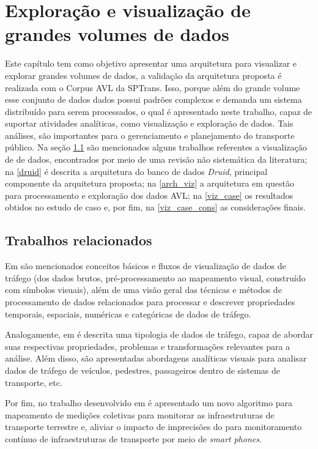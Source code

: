 \documentclass[
	12pt,				%
	oneside,			%
	a4paper,			%
	english,			%
	brazil				%
	]{abntex2ppgsi}
\begin{document}
{{\chapter{Exploração e visualização de grandes volumes de dados}
\label{dataViz}

Este capítulo tem como objetivo apresentar uma arquitetura para visualizar e explorar grandes volumes de dados, a validação da arquitetura proposta é realizada com o Corpus AVL da SPTrans. Isso, porque além do grande volume esse conjunto de dados dados possui padrões complexos e demanda um sistema distribuído para serem processados, o qual é apresentado neste trabalho, capaz de suportar atividades analíticas, como visualização e exploração de dados. Tais análises, são importantes para o gerenciamento e planejamento do transporte público. Na seção \ref{related_work_data_viz} são mencionados alguns trabalhos referentes a visualização de de dados, encontrados por meio de uma revisão não sistemática da literatura; na \ref{druid} é descrita a arquitetura do banco de dados \textit{Druid}, principal componente da arquitetura proposta; na \ref{arch_viz} a arquitetura em questão para processamento e exploração dos dados AVL; na \ref{viz_case} os resultados obtidos no estudo de caso e, por fim, na \ref{viz_case_cons} as considerações finais.

\section{Trabalhos relacionados}
\label{related_work_data_viz}

Em \cite{chen2015survey} são mencionados conceitos básicos e fluxos de visualização de dados de tráfego (dos dados brutos, pré-processamento ao mapeamento visual, construído com símbolos visuais), além de uma visão geral das técnicas e métodos de processamento de dados relacionados para processar e descrever propriedades temporais, espaciais, numéricas e categóricas de dados de tráfego.

Analogamente, em \cite{andrienko2017visual} é descrita uma tipologia de dados de tráfego, capaz de abordar suas respectivas propriedades, problemas e transformações relevantes para a análise. Além disso, são apresentadas abordagens analíticas visuais para analisar dados de tráfego de veículos, pedestres, passageiros dentro de sistemas de transporte, etc.

Por fim, no trabalho desenvolvido em \cite{seraj2017aggregation} é apresentado um novo algoritmo para mapeamento de medições coletivas para monitorar as infraestruturas de transporte terrestre e, aliviar o impacto de imprecisões do  para monitoramento contínuo de infraestruturas de transporte por meio de \textit{smart phones}.

}}
\end{document}
